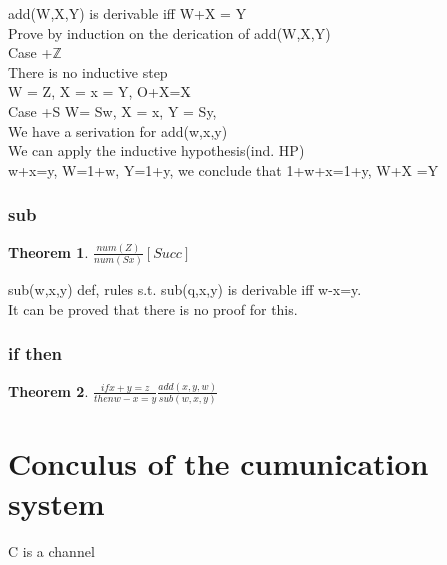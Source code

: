 \documentclass[a4paper,10pt,titlepage]{report}
\newtheorem{theorem}{Theorem}
\newcommand{\Z}{\mathbb{Z}}
\begin{document}
add(W,X,Y) is derivable iff W+X = Y\\

Prove by induction on the derication of add(W,X,Y)\\

Case +$\Z$\\
There is no inductive step\\

W = Z, X = x = Y, O+X=X$ \check{}$\\

Case +S W= Sw, X = x, Y = Sy,\\

We have a serivation for add(w,x,y)\\
We can apply the inductive hypothesis(ind. HP)\\
w+x=y, W=1+w, Y=1+y, we conclude that 1+w+x=1+y, W+X =Y\\


\subsubsection{sub}
\begin{theorem}

$\frac{num(Z)}{num(Sx)}[Succ]$

\end{theorem}

sub(w,x,y) def, rules s.t. sub(q,x,y) is derivable iff w-x=y.\\

It can be proved that there is no proof for this.\\



\subsubsection{if then}

\begin{theorem}

$\frac{if x+y=z}{then w-x=y}\frac{add(x,y,w)}{sub(w,x,y)}$

\end{theorem}

\newpage

\section{Conculus of the cumunication system}

C is a channel\\
\end{document}
